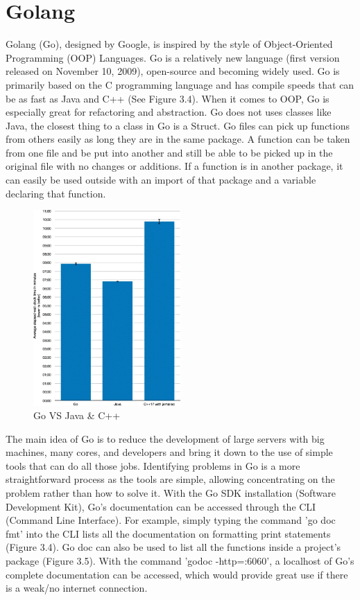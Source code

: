 \section{Golang}
Golang (Go), designed by Google, is inspired by the style of Object-Oriented Programming (OOP) Languages. Go is a relatively new language (first version released on November 10, 2009), open-source and becoming widely used. Go is primarily based on the C programming language and has compile speeds that can be as fast as Java and C++ (See Figure 3.4). \cite{ref6} When it comes to OOP, Go is especially great for refactoring and abstraction. Go does not uses classes like Java, the closest thing to a class in Go is a Struct. \cite{ref7} Go files can pick up functions from others easily as long they are in the same package. A function can be taken from one file and be put into another and still be able to be picked up in the original file with no changes or additions. If a function is in another package, it can easily be used outside with an import of that package and a variable declaring that function. 

\begin{figure}[H]
    \caption{Go VS Java \& C++ \cite{ref6}}
    \label{image:goJavaCpp}
    \centering
    \includegraphics[width=0.5\textwidth]{images/misc/go-java-cpp.png}
\end{figure}

The main idea of Go is to reduce the development of large servers with big machines, many cores, and developers and bring it down to the use of simple tools that can do all those jobs. Identifying problems in Go is a more straightforward process as the tools are simple, allowing concentrating on the problem rather than how to solve it. With the Go SDK installation (Software Development Kit), Go's documentation can be accessed through the CLI (Command Line Interface). For example, simply typing the command 'go doc fmt' into the CLI lists all the documentation on formatting print statements (Figure 3.4). Go doc can also be used to list all the functions inside a project's package (Figure 3.5). With the command 'godoc -http=:6060', a localhost of Go's complete documentation can be accessed, which would provide great use if there is a weak/no internet connection.

